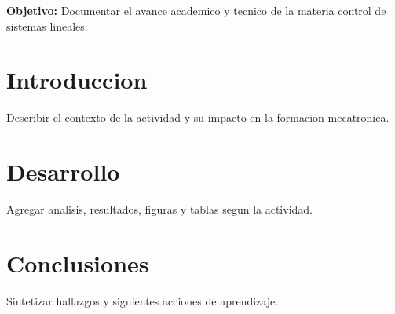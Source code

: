 \documentclass[spanish,letterpaper,oneside]{article}
\begin{document}
\templatePortrait
\templatePagecfg
\onehalfspacing

\begin{abstractd}
\textbf{Objetivo:} Documentar el avance academico y tecnico de la materia control de sistemas lineales.
\end{abstractd}

\templateIndex
\templateFinalcfg

\section{Introduccion}
Describir el contexto de la actividad y su impacto en la formacion mecatronica.

\section{Desarrollo}
Agregar analisis, resultados, figuras y tablas segun la actividad.

\section{Conclusiones}
Sintetizar hallazgos y siguientes acciones de aprendizaje.



\end{document}
